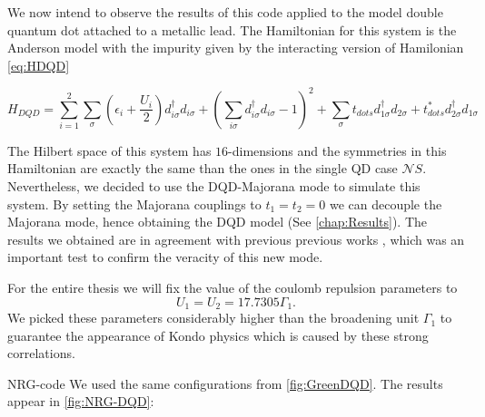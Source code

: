 We now intend to observe the results of this code applied to the model double quantum dot attached to a metallic lead.
The  Hamiltonian for this system is the Anderson model with the impurity given by the interacting version of Hamilonian \ref{eq:HDQD}

\begin{equation}
H_{DQD}=\sum_{i=1}^2\sum_\sigma \left( \epsilon_{i} + \frac{U_i}{2} \right) d_{i\sigma}^{\dagger}d_{i\sigma} + \left(\sum_{i\sigma} d_{i\sigma}^{\dagger}d_{i\sigma} -1 \right)^2 + \sum_\sigma t_{dots}d_{1\sigma}^{\dagger}d_{2\sigma}+t_{dots}^*d_{2\sigma}^{\dagger}d_{1\sigma}
\label{eq:interactingDQD}
\end{equation}

 The Hilbert space of this system has $16$-dimensions and the symmetries in this Hamiltonian are exactly the same than the ones in the single QD case $\mathcal{N}S$. Nevertheless, we decided to use the DQD-Majorana mode to simulate this system. By setting the Majorana couplings to $t_1=t_2= 0$ we can decouple the Majorana mode, hence obtaining the DQD model (See \ref{chap:Results}). The results we obtained are in agreement with previous previous works \cite{dias_da_silva_transmission_2008}, which was an important test to confirm the veracity of this new mode. 

For the entire thesis we will fix the value of the coulomb repulsion parameters to 
\begin{equation}
 U_1 = U_2 = 17.7305 \Gamma_1.
\end{equation}
\noindent We picked these parameters considerably higher than the broadening unit $\Gamma_1$ to guarantee the appearance of Kondo physics which is caused by these strong correlations. 




 NRG-code  We used the same configurations from \ref{fig:GreenDQD}. The  results appear in \ref{fig:NRG-DQD}:

